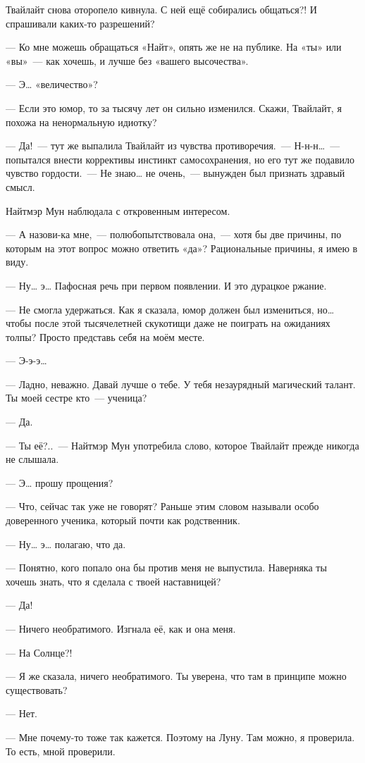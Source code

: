\documentclass[twoside,a5paper,12pt]{extbook}
\begin{document}
Твайлайт снова оторопело кивнула. С ней ещё собирались общаться?! И спрашивали каких-то разрешений?

— Ко мне можешь обращаться «Найт», опять же не на публике. На «ты» или «вы» — как хочешь, и лучше без «вашего высочества».

— Э… «величество»?

— Если это юмор, то за тысячу лет он сильно изменился. Скажи, Твайлайт, я похожа на ненормальную идиотку?

— Да! — тут же выпалила Твайлайт из чувства противоречия. — Н-н-н… — попытался внести коррективы инстинкт самосохранения, но его тут же подавило чувство гордости. — Не знаю… не очень, — вынужден был признать здравый смысл.

Найтмэр Мун наблюдала с откровенным интересом.

— А назови-ка мне, — полюбопытствовала она, — хотя бы две причины, по которым на этот вопрос можно ответить «да»? Рациональные причины, я имею в виду.

— Ну… э… Пафосная речь при первом появлении. И это дурацкое ржание.

— Не смогла удержаться. Как я сказала, юмор должен был измениться, но… чтобы после этой тысячелетней скукотищи даже не поиграть на ожиданиях толпы? Просто представь себя на моём месте.

— Э-э-э…

— Ладно, неважно. Давай лучше о тебе. У тебя незаурядный магический талант. Ты моей сестре кто — ученица?

— Да.

— Ты её?.. — Найтмэр Мун употребила слово, которое Твайлайт прежде никогда не слышала.

— Э… прошу прощения?

— Что, сейчас так уже не говорят? Раньше этим словом называли особо доверенного ученика, который почти как родственник.

— Ну… э… полагаю, что да.

— Понятно, кого попало она бы против меня не выпустила. Наверняка ты хочешь знать, что я сделала с твоей наставницей?

— Да!

— Ничего необратимого. Изгнала её, как и она меня.

— На Солнце?!

— Я же сказала, ничего необратимого. Ты уверена, что там в принципе можно существовать?

— Нет.

— Мне почему-то тоже так кажется. Поэтому на Луну. Там можно, я проверила. То есть, мной проверили.
\end{document}
